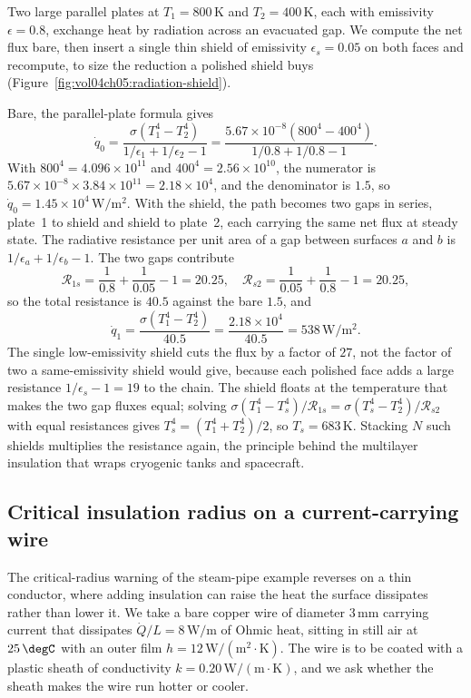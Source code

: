 Two large parallel plates at $T_1 = 800\,\si{\kelvin}$ and $T_2 =
400\,\si{\kelvin}$, each with emissivity $\epsilon = 0.8$, exchange heat
by radiation across an evacuated gap. We compute the net flux bare, then
insert a single thin shield of emissivity $\epsilon_s = 0.05$ on both
faces and recompute, to size the reduction a polished shield buys
(Figure~\ref{fig:vol04ch05:radiation-shield}).



Bare, the parallel-plate formula gives
\[
\dot{q}_0 = \frac{\sigma (T_1^4 - T_2^4)}{1/\epsilon_1 + 1/\epsilon_2 -
1} = \frac{5.67 \times 10^{-8} (800^4 - 400^4)}{1/0.8 + 1/0.8 - 1}.
\]
With $800^4 = 4.096 \times 10^{11}$ and $400^4 = 2.56 \times 10^{10}$,
the numerator is $5.67 \times 10^{-8} \times 3.84 \times 10^{11} =
2.18 \times 10^4$, and the denominator is $1.5$, so $\dot{q}_0 = 1.45
\times 10^4\,\text{W}/\text{m}^2$. With the shield, the path becomes two
gaps in series, plate~1 to shield and shield to plate~2, each carrying
the same net flux at steady state. The radiative resistance per unit
area of a gap between surfaces $a$ and $b$ is $1/\epsilon_a + 1/\epsilon_b
- 1$. The two gaps contribute
\[
\mathcal{R}_{1s} = \frac{1}{0.8} + \frac{1}{0.05} - 1 = 20.25, \quad
\mathcal{R}_{s2} = \frac{1}{0.05} + \frac{1}{0.8} - 1 = 20.25,
\]
so the total resistance is $40.5$ against the bare $1.5$, and
\[
\dot{q}_1 = \frac{\sigma(T_1^4 - T_2^4)}{40.5} = \frac{2.18 \times
10^4}{40.5} = 538\,\text{W}/\text{m}^2.
\]
The single low-emissivity shield cuts the flux by a factor of $27$, not
the factor of two a same-emissivity shield would give, because each
polished face adds a large resistance $1/\epsilon_s - 1 = 19$ to the
chain. The shield floats at the temperature that makes the two gap
fluxes equal; solving $\sigma(T_1^4 - T_s^4)/\mathcal{R}_{1s} =
\sigma(T_s^4 - T_2^4)/\mathcal{R}_{s2}$ with equal resistances gives
$T_s^4 = (T_1^4 + T_2^4)/2$, so $T_s = 683\,\si{\kelvin}$. Stacking
$N$ such shields multiplies the resistance again, the principle behind
the multilayer insulation that wraps cryogenic tanks and spacecraft.

\subsection{Critical insulation radius on a current-carrying wire}

The critical-radius warning of the steam-pipe example reverses on a thin
conductor, where adding insulation can raise the heat the surface
dissipates rather than lower it. We take a bare copper wire of diameter
$3\,\si{\milli\meter}$ carrying current that dissipates $\dot{Q}/L =
8\,\text{W}/\text{m}$ of Ohmic heat, sitting in still air at $25\,\degC$
with an outer film $h = 12\,\text{W}/(\text{m}^2\cdot\si{\kelvin})$. The
wire is to be coated with a plastic sheath of conductivity $k =
0.20\,\text{W}/(\text{m}\cdot\si{\kelvin})$, and we ask whether the
sheath makes the wire run hotter or cooler.

